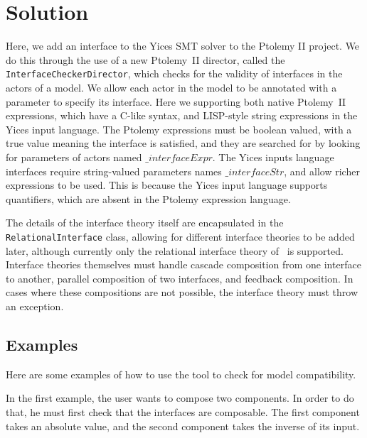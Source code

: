 \documentclass[preprint,11pt,authoryear]{sigplanconf}
\begin{document}
\section{Solution}
Here, we add an interface to the Yices\cite{yices} SMT solver to the Ptolemy II\cite{ptII} project.
We do this through the use of a new Ptolemy~II director, called the \texttt{InterfaceCheckerDirector}, which checks for the validity of interfaces in the actors of a model.
We allow each actor in the model to be annotated with a parameter to specify its interface.
Here we supporting both native Ptolemy~II expressions, which have a C-like syntax, and LISP-style string expressions in the Yices input language.
The Ptolemy expressions must be boolean valued, with a true value meaning the interface is satisfied, and they are searched for by looking for parameters of actors named $\_interfaceExpr$.
The Yices inputs language interfaces require string-valued parameters names $\_interfaceStr$, and allow richer expressions to be used.
This is because the Yices input language supports quantifiers, which are absent in the Ptolemy expression language.

The details of the interface theory itself are encapsulated in the \texttt{RelationalInterface} class, allowing for different interface theories to be added later, although currently only the relational interface theory of~\cite{relationalInterfaces} is supported.
Interface theories themselves must handle cascade composition from one interface to another, parallel composition of two interfaces,
and feedback composition.  In cases where these compositions are not possible, the interface theory must throw an exception.

\subsection{Examples}
Here are some examples of how to use the tool to check for model compatibility.

In the first example, the user wants to compose two components.  In order to do that, he must first check that the interfaces are composable.  The first component takes an absolute value, and the second component takes the inverse of its input.
\end{document}
